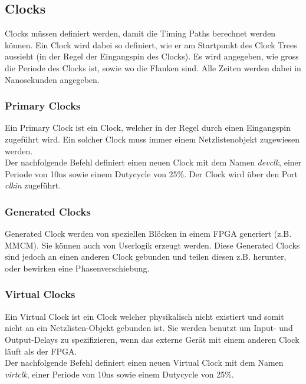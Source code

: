 \subsection{Clocks}
Clocks müssen definiert werden, damit die Timing Paths berechnet werden können. Ein Clock wird dabei so definiert, wie er am Startpunkt des Clock Trees aussieht (in der Regel der Eingangspin des Clocks). Es wird angegeben, wie gross die Periode des Clocks ist, sowie wo die Flanken sind. Alle Zeiten werden dabei in Nanosekunden angegeben.

\subsubsection{Primary Clocks}
Ein Primary Clock ist ein Clock, welcher in der Regel durch einen Eingangspin zugeführt wird. Ein solcher Clock muss immer einem Netzlistenobjekt zugewiesen werden. \\
Der nachfolgende Befehl definiert einen neuen Clock mit dem Namen \textit{devclk}, einer Periode von 10ns sowie einem Dutycycle von 25\%. Der Clock wird über den Port \textit{clkin} zugeführt.


\subsubsection{Generated Clocks}
Generated Clock werden von speziellen Blöcken in einem FPGA generiert (z.B. MMCM). Sie können auch von Userlogik erzeugt werden. Diese Generated Clocks sind jedoch an einen anderen Clock gebunden und teilen diesen z.B. herunter, oder bewirken eine Phasenverschiebung.

\subsubsection{Virtual Clocks}
Ein Virtual Clock ist ein Clock welcher physikalisch nicht existiert und somit nicht an ein Netzlisten-Objekt gebunden ist. Sie werden benutzt um Input- und Output-Delays zu spezifizieren, wenn das externe Gerät mit einem anderen Clock läuft als der FPGA. \\
Der nachfolgende Befehl definiert einen neuen Virtual Clock mit dem Namen \textit{virtclk}, einer Periode von 10ns sowie einem Dutycycle von 25\%.


